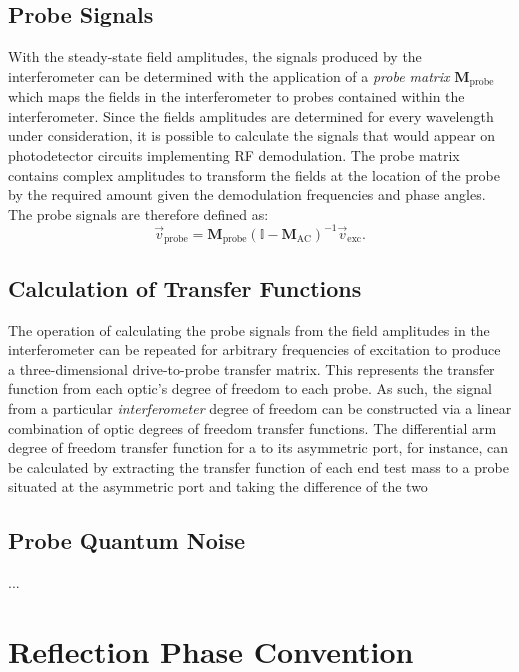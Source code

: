 \subsection{Probe Signals}
With the steady-state field amplitudes, the signals produced by the interferometer can be determined with the application of a \emph{probe matrix} $\mathbf{M}_{\text{probe}}$ which maps the fields in the interferometer to probes contained within the interferometer. Since the fields amplitudes are determined for every wavelength under consideration, it is possible to calculate the signals that would appear on photodetector circuits implementing RF demodulation. The probe matrix contains complex amplitudes to transform the fields at the location of the probe by the required amount given the demodulation frequencies and phase angles. The probe signals are therefore defined as:
\begin{equation}
  \vec{v}_{\text{probe}} = \mathbf{M}_{\text{probe}} \left( \mathbb{I} - \mathbf{M}_{\text{AC}} \right)^{-1} \vec{v}_{\text{exc}}.
\end{equation}

\subsection{Calculation of Transfer Functions}
The operation of calculating the probe signals from the field amplitudes in the interferometer can be repeated for arbitrary frequencies of excitation to produce a three-dimensional drive-to-probe transfer matrix. This represents the transfer function from each optic's degree of freedom to each probe. As such, the signal from a particular \emph{interferometer} degree of freedom can be constructed via a linear combination of optic degrees of freedom transfer functions. The differential arm degree of freedom transfer function for a \MI to its asymmetric port, for instance, can be calculated by extracting the transfer function of each end test mass to a probe situated at the asymmetric port and taking the difference of the two 

\subsection{Probe Quantum Noise}
...

\section{Reflection Phase Convention}
\label{a:reflection-phase}

